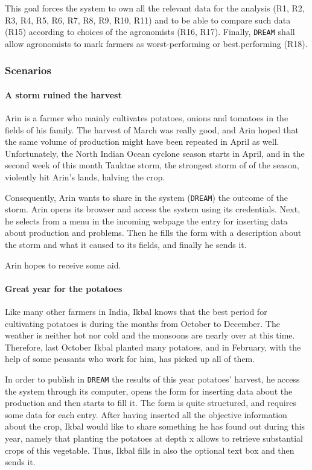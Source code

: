 \documentclass{article}
\begin{document}
This goal forces the system to own all the relevant data for the analysis (R1, R2, R3, R4, R5, R6, R7, R8, R9, R10, R11) and to be able to compare such data (R15) according to choices of the agronomists (R16, R17). Finally, \verb|DREAM| shall allow agronomists to mark farmers as worst-performing or best.performing (R18).
\subsubsection{Scenarios}
\paragraph{A storm ruined the harvest}
Arin is a farmer who mainly cultivates potatoes, onions and tomatoes in the fields of his family. The harvest of March was really good, and Arin hoped that the same volume of production might have been repeated in April as well. Unfortunately, the North Indian Ocean cyclone season starts in April, and in the second week of this month Tauktae storm, the strongest storm of of the season, violently hit Arin's lands, halving the crop.\par
\noindent Consequently, Arin wants to share in the system (\verb|DREAM|) the outcome of the storm. Arin opens its browser and access the system using its credentials. Next, he selects from a menu in the incoming webpage the entry for inserting data about production and problems. Then he fills the form with a description about the storm and what it caused to its fields, and finally he sends it.\par
\noindent Arin hopes to receive some aid.
\paragraph{Great year for the potatoes}
Like many other farmers in India, Ikbal knows that the best period for cultivating potatoes is during the months from October to December. The weather is neither hot nor cold and the monsoons are nearly over at this time. Therefore, last October Ikbal planted many potatoes, and in February, with the help of some peasants who work for him, has picked up all of them. \par
\noindent In order to publish in \verb|DREAM| the results of this year potatoes' harvest, he access the system through its computer, opens the form for inserting data about the production and then starts to fill it. The form is quite structured, and requires some data for each entry. After having inserted all the objective information about the crop, Ikbal would like to share something he has found out during this year, namely that planting the potatoes at depth x allows to retrieve substantial crops of this vegetable. Thus, Ikbal fills in also the optional text box and then sends it.
\end{document}
